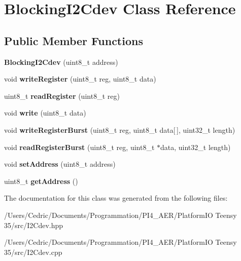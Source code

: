 \hypertarget{class_blocking_i2_cdev}{}\section{Blocking\+I2\+Cdev Class Reference}
\label{class_blocking_i2_cdev}
\subsection*{Public Member Functions}
\begin{DoxyCompactItemize}
\item 
\mbox{\label{class_blocking_i2_cdev_a0fde0f098f7443f25ba4ee66dc8656d3}} 
{\bfseries Blocking\+I2\+Cdev} (uint8\+\_\+t address)
\item 
\mbox{\label{class_blocking_i2_cdev_a528fa92440c8e1f3e2e68e6e12eb09ed}} 
void {\bfseries write\+Register} (uint8\+\_\+t reg, uint8\+\_\+t data)
\item 
\mbox{\label{class_blocking_i2_cdev_ae921432892f1bd7f9323c0845811a0ca}} 
uint8\+\_\+t {\bfseries read\+Register} (uint8\+\_\+t reg)
\item 
\mbox{\label{class_blocking_i2_cdev_a195c83df7f73030e210b7f34aad8a884}} 
void {\bfseries write} (uint8\+\_\+t data)
\item 
\mbox{\label{class_blocking_i2_cdev_a7350581e1372786804eb4f60401acbec}} 
void {\bfseries write\+Register\+Burst} (uint8\+\_\+t reg, uint8\+\_\+t data\mbox{[}$\,$\mbox{]}, uint32\+\_\+t length)
\item 
\mbox{\label{class_blocking_i2_cdev_aa13557dfd5b27ce0f1a357ffbb2b3135}} 
void {\bfseries read\+Register\+Burst} (uint8\+\_\+t reg, uint8\+\_\+t $\ast$data, uint32\+\_\+t length)
\item 
\mbox{\label{class_blocking_i2_cdev_ab4ff834e4e7225f612f0d2e8e86a54b1}} 
void {\bfseries set\+Address} (uint8\+\_\+t address)
\item 
\mbox{\label{class_blocking_i2_cdev_afa7188f7e0c3ad3c35c93b9c468f8292}} 
uint8\+\_\+t {\bfseries get\+Address} ()
\end{DoxyCompactItemize}


The documentation for this class was generated from the following files\+:\begin{DoxyCompactItemize}
\item 
/\+Users/\+Cedric/\+Documents/\+Programmation/\+P\+I4\+\_\+\+A\+E\+R/\+Platform\+I\+O Teensy 35/src/I2\+Cdev.\+hpp\item 
/\+Users/\+Cedric/\+Documents/\+Programmation/\+P\+I4\+\_\+\+A\+E\+R/\+Platform\+I\+O Teensy 35/src/I2\+Cdev.\+cpp\end{DoxyCompactItemize}
